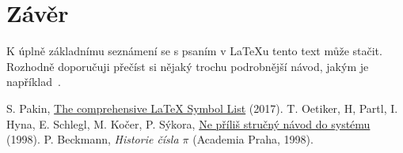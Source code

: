 \documentclass{article}
\begin{document}
		\section{Závěr}
		K úplně základnímu seznámení se s psaním v \LaTeX u tento text může stačit.
		Rozhodně doporučuji přečíst si nějaký trochu podrobnější návod, jakým je například~\cite{UvodLaTeX1998}.

	\begin{thebibliography}{99}
		 S. Pakin, \href{http://tug.ctan.org/info/symbols/comprehensive/symbols-a4.pdf}{The comprehensive \LaTeX{} Symbol List} (2017).
		 T. Oetiker, H, Partl, I. Hyna, E. Schlegl, M. Kočer, P. Sýkora,
			\href{http://www.penguin.cz/~kocer/texty/lshort2e/lshort2e-cz.pdf}{Ne příliš stručný návod do systému \LaTeXe} (1998).
		 P. Beckmann, \textit{Historie čísla $\pi$} (Academia Praha, 1998).
	\end{thebibliography}

	\tableofcontents

	\listoffigures

	\listoftables
\end{document}
